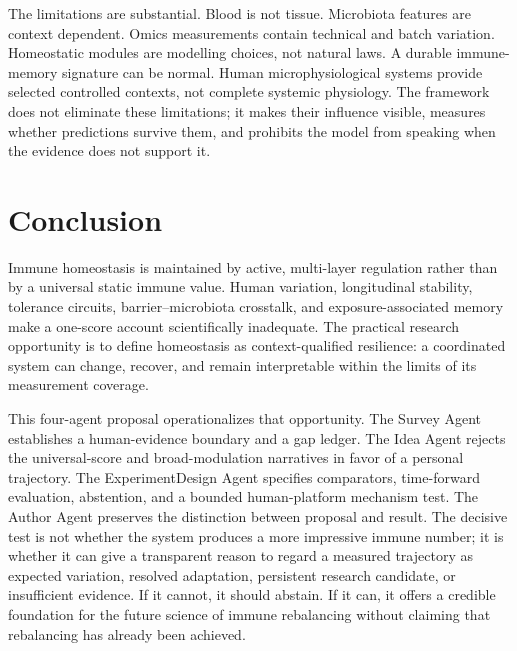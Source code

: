 \documentclass[conference]{IEEEtran}
\begin{document}
The limitations are substantial. Blood is not tissue. Microbiota features are context dependent. Omics measurements contain technical and batch variation. Homeostatic modules are modelling choices, not natural laws. A durable immune-memory signature can be normal. Human microphysiological systems provide selected controlled contexts, not complete systemic physiology. The framework does not eliminate these limitations; it makes their influence visible, measures whether predictions survive them, and prohibits the model from speaking when the evidence does not support it.

\section{Conclusion}

Immune homeostasis is maintained by active, multi-layer regulation rather than by a universal static immune value. Human variation, longitudinal stability, tolerance circuits, barrier--microbiota crosstalk, and exposure-associated memory make a one-score account scientifically inadequate. The practical research opportunity is to define homeostasis as context-qualified resilience: a coordinated system can change, recover, and remain interpretable within the limits of its measurement coverage.

This four-agent proposal operationalizes that opportunity. The Survey Agent establishes a human-evidence boundary and a gap ledger. The Idea Agent rejects the universal-score and broad-modulation narratives in favor of a personal trajectory. The ExperimentDesign Agent specifies comparators, time-forward evaluation, abstention, and a bounded human-platform mechanism test. The Author Agent preserves the distinction between proposal and result. The decisive test is not whether the system produces a more impressive immune number; it is whether it can give a transparent reason to regard a measured trajectory as expected variation, resolved adaptation, persistent research candidate, or insufficient evidence. If it cannot, it should abstain. If it can, it offers a credible foundation for the future science of immune rebalancing without claiming that rebalancing has already been achieved.
\end{document}
